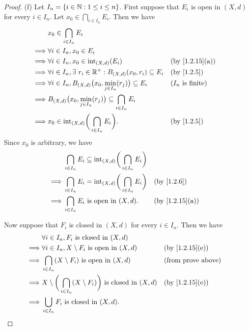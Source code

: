 \begin{proof}{(f)}
  Let \(I_n = \{i \in \mathbb{N} : 1 \leq i \leq n\}\).
  First suppose that \(E_i\) is open in \((X, d)\) for every \(i \in I_n\).
  Let \(x_0 \in \bigcap_{i \in I_n} E_i\).
  Then we have
  \begin{align*}
             & x_0 \in \bigcap_{i \in I_n} E_i                                                                                    \\
    \implies & \forall i \in I_n, x_0 \in E_i                                                                                     \\
    \implies & \forall i \in I_n, x_0 \in \text{int}_{(X, d)}(E_i)                              &  & \text{(by \cref{1.2.15}(a))} \\
    \implies & \forall i \in I_n, \exists\ r_i \in \R^+ : B_{(X, d)}(x_0, r_i) \subseteq E_i    &  & \text{(by \cref{1.2.5})}     \\
    \implies & \forall i \in I_n, B_{(X, d)}\big(x_0, \min_{j \in I_n}(r_j)\big) \subseteq E_i  &  & \text{(\(I_n\) is finite)}   \\
    \implies & B_{(X, d)}\big(x_0, \min_{j \in I_n}(r_j)\big) \subseteq \bigcap_{i \in I_n} E_i                                   \\
    \implies & x_0 \in \text{int}_{(X, d)}\bigg(\bigcap_{i \in I_n} E_i\bigg).                  &  & \text{(by \cref{1.2.5})}
  \end{align*}
  Since \(x_0\) is arbitrary, we have
  \begin{align*}
             & \bigcap_{i \in I_n} E_i \subseteq \text{int}_{(X, d)}\bigg(\bigcap_{i \in I_n} E_i\bigg)                                   \\
    \implies & \bigcap_{i \in I_n} E_i = \text{int}_{(X, d)}\bigg(\bigcap_{i \in I_n} E_i\bigg)         &  & \text{(by \cref{1.2.6})}     \\
    \implies & \bigcap_{i \in I_n} E_i \text{ is open in } (X, d).                                      &  & \text{(by \cref{1.2.15}(a))}
  \end{align*}

  Now suppose that \(F_i\) is closed in \((X, d)\) for every \(i \in I_n\).
  Then we have
  \begin{align*}
             & \forall i \in I_n, F_i \text{ is closed in } (X, d)                                                                          \\
    \implies & \forall i \in I_n, X \setminus F_i \text{ is open in } (X, d)                              &  & \text{(by \cref{1.2.15}(e))} \\
    \implies & \bigcap_{i \in I_n} (X \setminus F_i) \text{ is open in } (X, d)                           &  & \text{(from prove above)}    \\
    \implies & X \setminus \bigg(\bigcap_{i \in I_n} (X \setminus F_i)\bigg) \text{ is closed in } (X, d) &  & \text{(by \cref{1.2.15}(e))} \\
    \implies & \bigcup_{i \in I_n} F_i \text{ is closed in } (X, d).
  \end{align*}
\end{proof}


